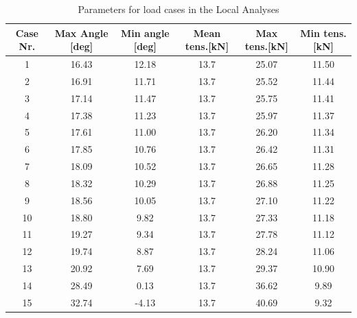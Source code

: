 \begin{table} [H]
\centering
\begin{tabular}{ |c|c|c|c|c|c|}
\hline
	Case Nr. & Max Angle [deg] & Min angle [deg] & Mean tens.[kN] & Max tens.[kN]  & Min tens.[kN]   \\
 \hline
 \hline
	1 & 16.43 & 12.18 & 13.7 & 25.07 & 11.50   \\ 
	2 &  16.91 & 11.71 & 13.7 & 25.52 & 11.44   \\
	3 &  17.14 & 11.47 & 13.7 & 25.75 & 11.41   \\ 
	4 &  17.38 & 11.23 & 13.7 & 25.97 & 11.37  \\ 
	5 &  17.61 & 11.00 & 13.7 & 26.20 & 11.34  \\ 
	6 &  17.85 & 10.76 & 13.7 & 26.42 & 11.31  \\ 
	7 &  18.09 & 10.52 & 13.7 & 26.65 & 11.28   \\ 
	8 &  18.32 & 10.29 & 13.7 & 26.88 & 11.25  \\ 
	9 &  18.56 & 10.05 & 13.7 & 27.10 & 11.22  \\ 
	10 &  18.80 & 9.82 & 13.7 & 27.33 & 11.18  \\ 
	11 & 19.27 & 9.34 & 13.7 & 27.78 & 11.12  \\ 
	12 &  19.74 & 8.87 & 13.7 & 28.24 & 11.06  \\ 
	13 &  20.92 & 7.69 & 13.7 & 29.37 & 10.90  \\ 
	14 &  28.49 & 0.13 & 13.7 & 36.62 & 9.89  \\ 
	15 &  32.74 & -4.13 & 13.7 & 40.69 & 9.32 \\ 
 \hline
\end{tabular}
\caption{Parameters for load cases in the Local Analyses}
\label{table:loadcase}
\end{table} 

